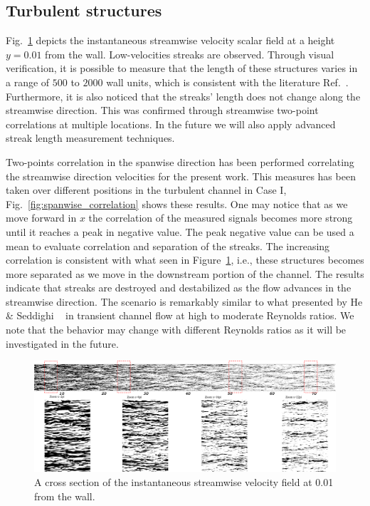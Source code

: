 \documentclass[twocolumn,10pt]{asme2e}
\begin{document}
\subsection*{Turbulent structures}

Fig.~\ref{fig:streaks} depicts the  instantaneous streamwise velocity scalar field at a height \(y=0.01\) from the wall. Low-velocities streaks are observed. Through visual verification, it is possible to measure that the length of these structures varies in a range of \(500\) to \(2000\) wall units, which is consistent with the literature Ref.~\cite{carlier2005}. Furthermore, it is also noticed that the streaks' length does not change along the streamwise direction. This was confirmed through streamwise two-point correlations at multiple locations. In the future we will also apply advanced streak length measurement techniques.

Two-points correlation in the spanwise direction has been performed correlating the streamwise direction velocities for the present work. This measures has been taken over different positions in the turbulent channel in Case I, Fig.~\ref{fig:spanwise_correlation} shows these results. One may notice that as we move forward in \(x\) the correlation of the measured signals becomes more strong until it reaches a peak in negative value. The peak negative value can be used a mean to evaluate correlation and separation of the streaks.  The increasing correlation is consistent with what seen  in Figure~\ref{fig:streaks}, i.e., these structures becomes more separated as we move in the downstream portion of the channel.
The results indicate that streaks are destroyed and destabilized as the flow advances  in the streamwise direction. The scenario is remarkably similar to what presented by He \& Seddighi ~\cite{he2015} in transient channel flow at high to moderate Reynolds ratios. We note that the behavior may change with different Reynolds ratios as it will be investigated in the future.

\begin{figure}[t]
	\includegraphics[width=\textwidth]{streaks.pdf}
	\caption{A cross section of the instantaneous streamwise velocity field at 0.01 from the wall.}
	\label{fig:streaks}
\end{figure}
\end{document}
